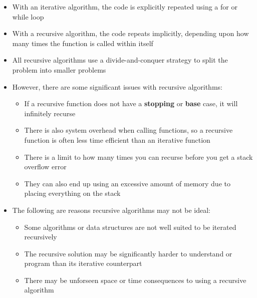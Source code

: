 \begin{itemize}
  \item With an iterative algorithm, the code is explicitly repeated using a for or while loop
  \item With a recursive algorithm, the code repeats implicitly, depending upon how many times the function is called within itself
  \item All recursive algorithms use a divide-and-conquer strategy to split the problem into smaller problems
  \item However, there are some significant issues with recursive algorithms:
  \begin{itemize}
    \item If a recursive function does not have a \textbf{stopping} or \textbf{base} case, it will infinitely recurse
    \item There is also system overhead when calling functions, so a recursive function is often less time efficient than an iterative function
    \item There is a limit to how many times you can recurse before you get a stack overflow error
    \item They can also end up using an excessive amount of memory due to placing everything on the stack
  \end{itemize}
  \item The following are reasons recursive algorithms may not be ideal:
  \begin{itemize}
    \item Some algorithms or data structures are not well suited to be iterated recursively
    \item The recursive solution may be significantly harder to understand or program than its iterative counterpart
    \item There may be unforseen space or time consequences to using a recursive algorithm
  \end{itemize}
\end{itemize}
